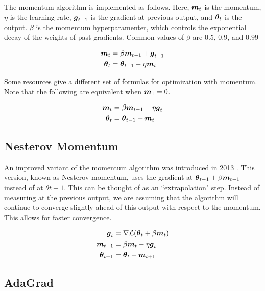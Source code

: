 \documentclass{article}
\begin{document}
The momentum algorithm is implemented as follows. Here, \(\vb*{m}_t\) is the momentum, \(\eta\) is the learning rate, \(\vb*{g}_{t-1}\) is the gradient at previous output, and \(\vb*{\theta}_t\) is the output. \(\beta\) is the momentum hyperparamenter, which controls the exponential decay of the weights of past gradients. Common values of \(\beta\) are \(0.5\), \(0.9\), and \(0.99\) \cite{pml1book}



\begin{align*}
    \vb*{m}_t &= \beta \vb*{m}_{t-1} + \vb*{g}_{t-1} \\
    \vb*{\theta}_t &= \vb*{\theta}_{t-1} - \eta \vb*{m}_t
\end{align*}


Some resources give a different set of formulas for optimization with momentum. Note that the following are equivalent when \(\vb*{m}_1 = 0\).

\begin{align*}
    \vb*{m}_t &= \beta \vb*{m}_{t-1} - \eta \vb*{g}_t \\
    \vb*{\theta}_t &= \vb*{\theta}_{t-1} + \vb*{m}_t
\end{align*}

\subsection{Nesterov Momentum}

An improved variant of the momentum algorithm was introduced in 2013 \cite{sutskever13}. This version, known as Nesterov momentum, uses the gradient at \(\vb*{\theta}_{t-1} + \beta \vb*{m}_{t-1}\) instead of at \(\theta{t-1}\). This can be thought of as an ``extrapolation" step. Instead of measuring at the previous output, we are assuming that the algorithm will continue to converge slightly ahead of this output with respect to the momentum. This allows for faster convergence.

\begin{align*}
    \vb*{g}_{t} &= \nabla \mathcal{L} (\vb*{\theta}_{t} + \beta \vb*{m}_{t}) \\
    \vb*{m}_{t+1} &= \beta \vb*{m}_{t} - \eta \vb*{g}_t \\
    \vb*{\theta}_{t+1} &= \vb*{\theta}_t + \vb*{m}_{t+1}
\end{align*}


\subsection{AdaGrad} %
\end{document}
